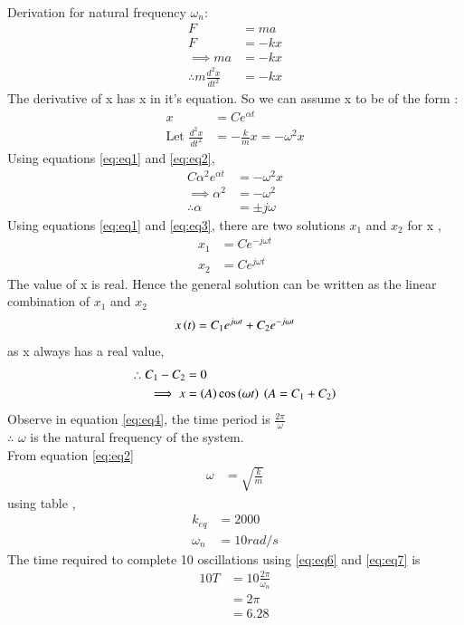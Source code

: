 \documentclass[journal,12pt,twocolumn]{IEEEtran}
\theoremstyle{remark}
\begin{document}
\solution\\

Derivation for natural frequency $\omega_n$:
\begin{align}
    F &= ma \\
    F &= -kx \\
    \implies ma &= -kx\\
    \therefore m\frac{d^2x}{dt^2} &= -kx\label{eq:eq5}
\end{align}
The derivative of x has x in it's equation. So we can assume x to be of the form :
\begin{align}
    x &= Ce^{\alpha t} \label{eq:eq1}\\
    \text{Let } \frac{d^2x}{dt^2} &= -\frac{k}{m}x = -\omega^2 x \label{eq:eq2}
\end{align}
Using equations \eqref{eq:eq1} and \eqref{eq:eq2},
\begin{align}
    C\alpha^2 e^{\alpha t} &= -\omega^2 x\\
    \implies \alpha^2 &= -\omega^2\\
    \therefore \alpha &= \pm  j  \omega \label{eq:eq3}
\end{align}
Using equations \eqref{eq:eq1} and \eqref{eq:eq3}, there are two solutions $x_1$ and $x_2$ for x ,
\begin{align}
    x_1 &= Ce^{-j \omega t}\\
     x_2 &= Ce^{j \omega t}
\end{align}
The value of x is real. Hence the general solution can be written as the linear combination of $x_1$ and $x_2$ 
\begin{align}
    x\left(t\right) = C_1e^{j \omega t} + C_2e^{-j \omega t}
\end{align}
as x always has a real value,
\begin{align}
    \therefore C_1 - C_2 &= 0  \\
    \implies x  &= \left(A\right)\cos\left(\omega t\right) \text{ $\left(A = C_1 + C_2\right)$}\label{eq:eq4} 
\end{align}
Observe in equation \eqref{eq:eq4}, the time period is $\frac{2\pi}{\omega}$\\
$\therefore$ $\omega$ is the natural frequency of the system.\\
From equation \eqref{eq:eq2}
\begin{align}
    \omega &= \sqrt{\frac{k}{m}}
\end{align}
using table  ,
\begin{align}
    k_{eq} &= 2000 \label{eq:eq6}\\
    \omega_n &= 10 rad/s\label{eq:eq7}
\end{align}
The time required to complete 10 oscillations using \eqref{eq:eq6} and \eqref{eq:eq7} is \\
\begin{align}
    10T &= 10\frac{2\pi}{\omega_n}\\
    &= 2\pi\\
    &= 6.28
\end{align}
\end{document}

